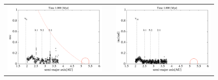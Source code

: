\documentclass[11pt,a4paper,oneside,onecolumn]{jreport}
\begin{document}
\begin{figure}[H]
\begin{tabular}{ccc}
\begin{minipage}[t]{0.45\hsize}
\centering
\includegraphics[width=8cm]{./image/asteroid_ecc_1Myr.pdf}
\end{minipage} &
\begin{minipage}[t]{0.1\hsize}
\end{minipage} &
\begin{minipage}[t]{0.45\hsize}
\centering
\includegraphics[width=8cm]{./image/asteroid_inc_1Myr.pdf}
\end{minipage}\\
%
\end{tabular}
\caption{\label{fig:asteroid_ecc_inc_1Myr}}
\end{figure}
\end{document}
